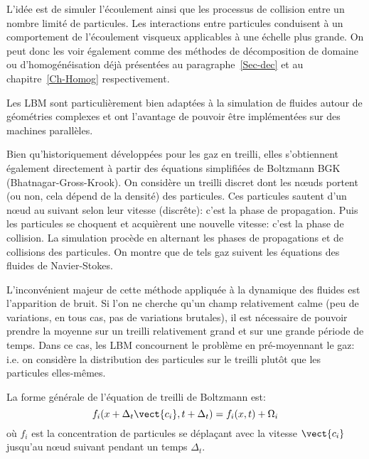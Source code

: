 L'idée est de simuler l'écoulement ainsi que les processus de collision entre un nombre limité de 
particules. Les interactions entre particules conduisent à un comportement de l'écoulement 
visqueux applicables à une échelle plus grande. 
On peut donc les voir également comme des méthodes de décomposition de domaine ou
d'homogénéisation déjà présentées au paragraphe~\ref{Sec-dec} et au chapitre~\ref{Ch-Homog}
respectivement.


\medskip
Les LBM sont particulièrement bien adaptées à la simulation de fluides autour de géométries
complexes et ont l'avantage de pouvoir être implémentées sur des machines parallèles.

Bien qu'historiquement développées pour les gaz en treilli, elles s'obtiennent également directement
à partir des équations simplifiées de Boltzmann BGK (Bhatnagar-Gross-Krook).
On considère un treilli discret dont les nœuds portent (ou non, cela dépend de la
densité) des particules.
Ces particules sautent d'un nœud au suivant selon leur vitesse (discrête): c'est la
phase de propagation.
Puis les particules se choquent et acquièrent une nouvelle vitesse: c'est la phase de collision.
La simulation procède en alternant les phases de propagations et de collisions des particules. 
On montre que de tels gaz suivent les équations des fluides de Navier-Stokes.

L'inconvénient majeur de cette méthode appliquée à la dynamique des fluides est l'apparition 
de \og bruit\fg.
Si l'on ne cherche qu'un champ relativement calme (peu de variations, en tous cas, pas de variations brutales),
il est nécessaire de pouvoir prendre la moyenne sur un treilli relativement grand et sur une grande
période de temps.
Dans ce cas, les LBM concournent le problème en pré-moyennant le gaz: i.e. on considère
la distribution des particules sur le treilli plutôt que les particules elles-mêmes.

\medskip
La forme générale de l'équation de treilli de Boltzmann est:
\begin{equation} f_i(x+\Delta_t \vect{c_i}, t+\Delta_t) = f_i(x,t) + \Omega_i \end{equation}
où $f_i$ est la concentration de particules se déplaçant avec la vitesse $\vect{c_i}$ jusqu'au nœud suivant
pendant un temps $\Delta_t$.

